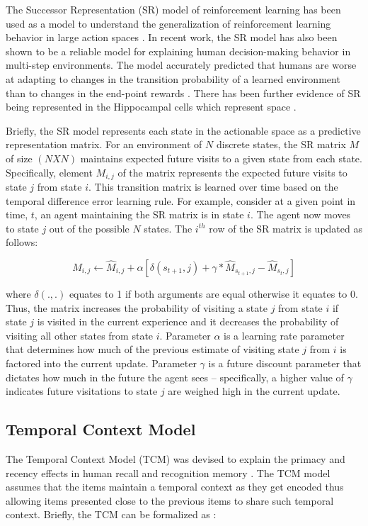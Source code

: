 The Successor Representation (SR) model of reinforcement learning has been used as a model to understand the generalization of reinforcement learning behavior in large action spaces \cite{dayan1993improving}. In recent work, the SR model has also been shown to be a reliable model for explaining human decision-making behavior in multi-step environments. The model accurately predicted that humans are worse at adapting to changes in the transition probability of a learned environment than to changes in the end-point rewards \cite{momennejad2017successor}. There has been further evidence of SR being represented in the Hippocampal cells which represent space \cite{gershman2018successor, stachenfeld2017hippocampus}.

Briefly, the SR model represents each state in the actionable space as a predictive representation matrix. For an environment of $N$ discrete states, the SR matrix $M$ of size $(N X N)$ maintains expected future visits to a given state from each state. Specifically, element $M_{i,j}$ of the matrix represents the expected future visits to state $j$ from state $i$. This transition matrix is learned over time based on the temporal difference error learning rule. For example, consider at a given point in time, $t$, an agent maintaining the SR matrix is in state $i$. The agent now moves to state $j$ out of the possible $N$ states. The $i^{th}$ row of the SR matrix is updated as follows:

\begin{equation}
	M_{i,j} \leftarrow \hat{M}_{i,j} + \alpha[\delta(s_{t+1},j) + \gamma*\hat{M}_{s_{t+1},j} - \hat{M}_{s_t,j}]
\end{equation}

where $\delta(., .)$ equates to 1 if both arguments are equal otherwise it equates to 0. Thus, the matrix increases the probability of visiting a state $j$ from state $i$ if state $j$ is visited in the current experience and it decreases the probability of visiting all other states from state $i$. Parameter $\alpha$ is a learning rate parameter that determines how much of the previous estimate of visiting state $j$ from $i$ is factored into the current update. Parameter $\gamma$ is a future discount parameter that dictates how much in the future the agent sees -- specifically, a higher value of $\gamma$ indicates future visitations to state $j$ are weighed high in the current update.

\subsection{Temporal Context Model}
The Temporal Context Model (TCM) was devised to explain the primacy and recency effects in human recall and recognition memory \cite{howard2005temporal}. The TCM model assumes that the items maintain a temporal context as they get encoded thus allowing items presented close to the previous items to share such temporal context. Briefly, the TCM can be formalized as \cite{gershman2012successor}:

